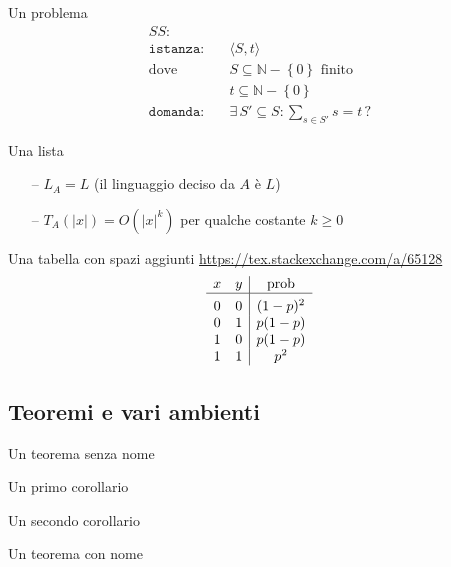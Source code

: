 Un problema
\begin{align*}
    SS: & \\
    \texttt{istanza:} \quad &
    \langle
        S,t
    \rangle
    \\
    \text{dove} \quad &
    S \subseteq \mathbb{N} - \left\{ 0 \right\} \text{ finito}
    \\
    &
    t \subseteq \mathbb{N} - \left\{ 0 \right\} \\
    \texttt{domanda:} \quad &
    \exists \, S' \subseteq S : \sum_{s \in S'}^{} s = t \, ?
\end{align*}

Una lista
\begin{itemize}[noitemsep,parsep=0pt,partopsep=0pt,topsep=0pt]
    \item[--] $L_A = L$ (il linguaggio deciso da $A$ è $L$)
    \item[--] $T_A(|x|) = O(|x|^k)$ per qualche costante $k \geq 0$
\end{itemize}

Una tabella con spazi aggiunti \url{https://tex.stackexchange.com/a/65128}
\begin{equation*}
    \begin{array}[h]{cc|c}
        x & y & \text{prob} \\
        \hline
        \rule{0pt}{1.0\normalbaselineskip}
        0 & 0 & (1-p)^2 \\
        0 & 1 & p(1-p) \\
        1 & 0 & p(1-p) \\
        1 & 1 & p^2
    \end{array}
\end{equation*}

\subsection{Teoremi e vari ambienti }

\begin{theorem}
    Un teorema senza nome
\end{theorem}

\begin{corollario}
    Un primo corollario
\end{corollario}

\begin{corollario}
    Un secondo corollario
\end{corollario}

\begin{theorem}
    Un teorema con nome
\end{theorem}

